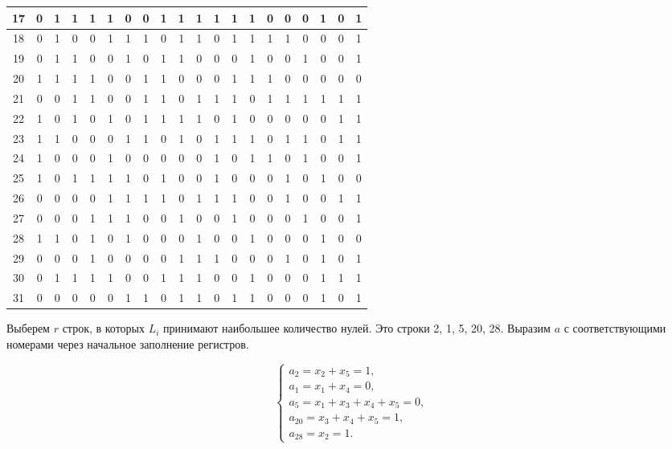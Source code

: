 \documentclass[letterpaper,11pt,openany]{book}
\begin{document}
\begin{adjustbox}{center}
\begin{tabular}{||c|c|c|c|c|c|c|c|c|c|c|c|c|c|c|c|c|c|c|c||}
\hline
17 & 0 & 1 & 1 & 1 & 1 & 0 & 0 & 1 & 1 & 1 & 1 & 1 & 1 & 0 & 0 & 0 & 1 & 0 & 1 \\
\hline
18 & 0 & 1 & 0 & 0 & 1 & 1 & 1 & 0 & 1 & 1 & 0 & 1 & 1 & 1 & 1 & 0 & 0 & 0 & 1 \\
\hline
19 & 0 & 1 & 1 & 0 & 0 & 1 & 0 & 1 & 1 & 0 & 0 & 0 & 1 & 0 & 0 & 1 & 0 & 0 & 1 \\
\hline
20 & 1 & 1 & 1 & 1 & 0 & 0 & 1 & 1 & 0 & 0 & 0 & 1 & 1 & 1 & 0 & 0 & 0 & 0 & 0 \\
\hline
21 & 0 & 0 & 1 & 1 & 0 & 0 & 1 & 1 & 0 & 1 & 1 & 1 & 0 & 1 & 1 & 1 & 1 & 1 & 1 \\
\hline
22 & 1 & 0 & 1 & 0 & 1 & 0 & 1 & 1 & 1 & 1 & 0 & 1 & 0 & 0 & 0 & 0 & 0 & 1 & 1 \\
\hline
23 & 1 & 1 & 0 & 0 & 0 & 1 & 1 & 0 & 1 & 0 & 1 & 1 & 1 & 0 & 1 & 1 & 0 & 1 & 1 \\
\hline
24 & 1 & 0 & 0 & 0 & 1 & 0 & 0 & 0 & 0 & 0 & 1 & 0 & 1 & 1 & 0 & 1 & 0 & 0 & 1 \\
\hline
25 & 1 & 0 & 1 & 1 & 1 & 1 & 0 & 1 & 0 & 0 & 1 & 0 & 0 & 0 & 1 & 0 & 1 & 0 & 0 \\
\hline
26 & 0 & 0 & 0 & 0 & 1 & 1 & 1 & 1 & 0 & 1 & 1 & 1 & 0 & 0 & 1 & 0 & 0 & 1 & 1 \\
\hline
27 & 0 & 0 & 0 & 1 & 1 & 1 & 0 & 0 & 1 & 0 & 0 & 1 & 0 & 0 & 0 & 1 & 0 & 0 & 1 \\
\hline
28 & 1 & 1 & 0 & 1 & 0 & 1 & 0 & 0 & 0 & 1 & 0 & 0 & 1 & 0 & 0 & 0 & 1 & 0 & 0 \\
\hline
29 & 0 & 0 & 0 & 1 & 0 & 0 & 0 & 0 & 1 & 1 & 1 & 0 & 0 & 0 & 1 & 0 & 1 & 0 & 1 \\
\hline
30 & 0 & 1 & 1 & 1 & 1 & 0 & 0 & 1 & 1 & 1 & 0 & 0 & 1 & 0 & 0 & 0 & 1 & 1 & 1 \\
\hline
31 & 0 & 0 & 0 & 0 & 0 & 1 & 1 & 0 & 1 & 1 & 0 & 1 & 1 & 0 & 0 & 0 & 1 & 0 & 1 \\
\hline
\end{tabular}
\end{adjustbox}

\medskip

Выберем $r$ строк, в которых $L_i$ принимают наибольшее количество нулей. Это строки 2, 1, 5, 20, 28. Выразим $a$ с соответствующими номерами через начальное заполнение регистров.

\begin{equation*}
\begin{cases}
a_2 = x_2 + x_5 = 1, \\
a_1 = x_1 + x_4 = 0, \\
a_5 = x_1 + x_3 + x_4 + x_5 = 0, \\
a_{20} = x_3 + x_4 + x_5 = 1, \\
a_{28} = x_2 = 1.
\end{cases}
\end{equation*}
\end{document}
